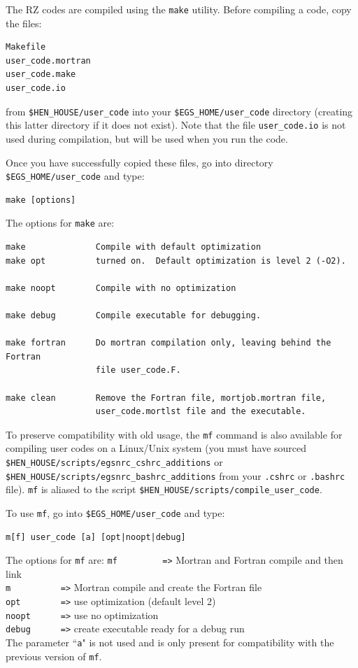 \documentclass[12pt,twoside]{article}  %
\begin{document}
The RZ codes are compiled using the {\tt make} utility.  Before compiling
a code, copy the files:\\
\begin{verbatim}
Makefile
user_code.mortran
user_code.make
user_code.io
\end{verbatim}
from {\tt \$HEN\_HOUSE/user\_code} into your {\tt \$EGS\_HOME/user\_code}
directory (creating this latter directory if it does not exist).
Note that the file {\tt user\_code.io} is not used during compilation, but
will be used when you run the code.

Once you have successfully copied these files, go into
directory {\tt \$EGS\_HOME/user\_code} and type:
\begin{verbatim}
make [options]
\end{verbatim}
The options for {\tt make} are:
\begin{verbatim}
make              Compile with default optimization
make opt          turned on.  Default optimization is level 2 (-O2).

make noopt        Compile with no optimization

make debug        Compile executable for debugging.

make fortran      Do mortran compilation only, leaving behind the Fortran
                  file user_code.F.

make clean        Remove the Fortran file, mortjob.mortran file,
                  user_code.mortlst file and the executable.
\end{verbatim}

To preserve compatibility with old usage, the {\tt mf} command is also
available for compiling user codes on a Linux/Unix system (you must have
sourced\\
{\tt \$HEN\_HOUSE/scripts/egsnrc\_cshrc\_additions} or\\
{\tt \$HEN\_HOUSE/scripts/egsnrc\_bashrc\_additions} from your
{\tt .cshrc} or {\tt .bashrc} file).  {\tt mf} is
aliased to the script {\tt \$HEN\_HOUSE/scripts/compile\_user\_code}.

To use {\tt mf}, go into {\tt \$EGS\_HOME/user\_code} and type:
\begin{verbatim}
m[f] user_code [a] [opt|noopt|debug]
\end{verbatim}
The options for {\tt mf} are:
\verb+mf         =>+ Mortran and Fortran compile and then link\\
\verb+m          =>+ Mortran compile and create the Fortran file\\
\verb+opt        =>+ use optimization (default level 2)\\
\verb+noopt      =>+ use no optimization\\
\verb+debug      =>+ create executable ready for a debug run\\
The parameter ``{\tt a}" is not used and is only present for compatibility
with the previous version of {\tt mf}.
\end{document}
